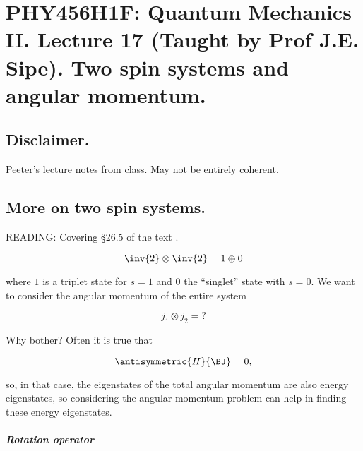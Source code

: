 
%

\chapter{PHY456H1F: Quantum Mechanics II.  Lecture 17 (Taught by Prof J.E. Sipe).  Two spin systems and angular momentum.}
\label{chap:qmTwoL17}
{}
\date{Nov 9, 2011}

\beginArtWithToc

\section{Disclaimer.}

Peeter's lecture notes from class.  May not be entirely coherent.

\section{More on two spin systems.}

READING: Covering \S 26.5 of the text \cite{desai2009quantum}.

\begin{equation}\label{eqn:qmTwoL17:20}
\inv{2} \otimes \inv{2} = 1 \oplus 0
\end{equation}

where $1$ is a triplet state for $s=1$ and $0$ the ``singlet'' state with $s=0$.  We want to consider the angular momentum of the entire system

\begin{equation}\label{eqn:qmTwoL17:40}
j_1 \otimes j_2 = ?
\end{equation}

Why bother?  Often it is true that 

\begin{equation}\label{eqn:qmTwoL17:60}
\antisymmetric{H}{\BJ} = 0,
\end{equation}

so, in that case, the eigenstates of the total angular momentum are also energy eigenstates, so considering the angular momentum problem can help in finding these energy eigenstates.

\paragraph{Rotation operator}

